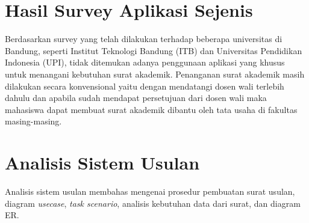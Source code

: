 \section{Hasil Survey Aplikasi Sejenis}
\label{sec:hasil_survey_aplikasi_sejenis}
Berdasarkan survey yang telah dilakukan terhadap beberapa universitas di Bandung, seperti Institut Teknologi Bandung (ITB) dan Universitas Pendidikan Indonesia (UPI), tidak ditemukan adanya penggunaan aplikasi yang khusus untuk menangani kebutuhan surat akademik. Penanganan surat akademik masih dilakukan secara konvensional yaitu dengan mendatangi dosen wali terlebih dahulu dan apabila sudah mendapat persetujuan dari dosen wali maka mahasiswa dapat membuat surat akademik dibantu oleh tata usaha di fakultas masing-masing.

\section{Analisis Sistem Usulan}
\label{sec:analisis_sistem_usulan}
Analisis sistem usulan membahas mengenai prosedur pembuatan surat usulan, diagram \textit{usecase}, \textit{task scenario}, analisis kebutuhan data dari surat, dan diagram ER. \\

